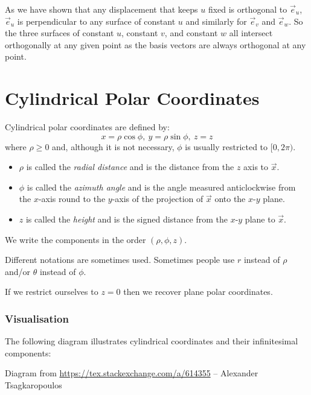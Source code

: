 \documentclass[../main.tex]{subfiles}
\begin{document}
As we have shown that any displacement that keeps $u$ fixed is orthogonal to $\vec{e}_u$, $\vec{e}_u$ is perpendicular to any surface of constant $u$ and similarly for $\vec{e}_v$ and $\vec{e}_w$.
So the three surfaces of constant $u$, constant $v$, and constant $w$ all intersect orthogonally at any given point as the basis vectors are always orthogonal at any point.
\section{Cylindrical Polar Coordinates}
\label{cylindricalPolar}
\begin{definition}
  Cylindrical polar coordinates are defined by:
  \[
    x = \rho \cos \phi,\ y = \rho \sin \phi,\ z = z
  \]
  where $\rho \geq 0$ and, although it is not necessary, $\phi$ is usually restricted to $[0, 2\pi)$.

  \begin{itemize}
    \item $\rho$ is called the \textit{radial distance} and is the distance from the $z$ axis to $\vec{x}$.
    \item $\phi$ is called the \textit{azimuth angle} and is the angle measured anticlockwise from the $x$-axis round to the $y$-axis of the projection of $\vec{x}$ onto the $x$-$y$ plane.
    \item $z$ is called the \textit{height} and is the signed distance from the $x$-$y$ plane to $\vec{x}$.
  \end{itemize}
  We write the components in the order $(\rho, \phi, z)$.
\end{definition}
\begin{remark}
  Different notations are sometimes used.
  Sometimes people use $r$ instead of $\rho$ and/or $\theta$ instead of $\phi$.
\end{remark}
\begin{remark}
  If we restrict ourselves to $z = 0$ then we recover plane polar coordinates.
\end{remark}
\subsubsection{Visualisation}
\label{cylinderVisualisation}
The following diagram illustrates cylindrical coordinates and their infinitesimal components:
\begin{center}
  \par
  \footnotesize{Diagram from \url{https://tex.stackexchange.com/a/614355} -- Alexander Tsagkaropoulos}
\end{center}
\end{document}
